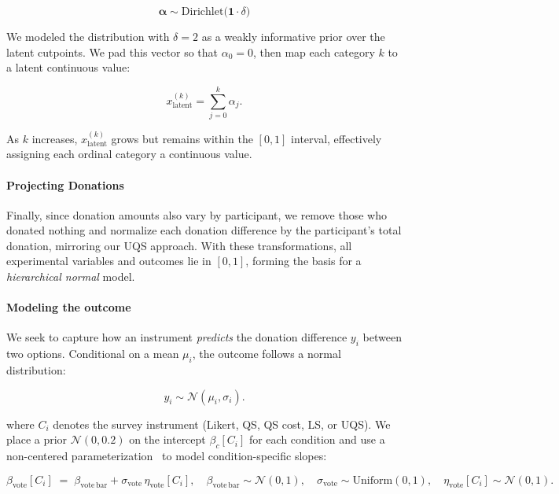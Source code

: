 \begin{equation}
    \boldsymbol{\alpha} \sim \mathrm{Dirichlet}\bigl(\mathbf{1}\cdot \delta\bigr)
\end{equation}

We modeled the distribution with $\delta=2$ as a weakly informative prior over the latent cutpoints. We pad this vector so that $\alpha_0 = 0$, then map each category $k$ to a latent continuous value:

\begin{equation}
    x_{\mathrm{latent}}^{(k)} = \sum_{j=0}^{k} \alpha_j.
\end{equation}

As $k$ increases, $x_{\mathrm{latent}}^{(k)}$ grows but remains within the $[0,1]$ interval, effectively assigning each ordinal category a continuous value. 

\paragraph{Projecting Donations} Finally, since donation amounts also vary by participant, we remove those who donated nothing and normalize each donation difference by the participant's total donation, mirroring our UQS approach. With these transformations, all experimental variables and outcomes lie in $[0,1]$, forming the basis for a \emph{hierarchical normal} model.

\paragraph{Modeling the outcome}
We seek to capture how an instrument \emph{predicts} the donation difference $y_i$ between two options. Conditional on a mean $\mu_i$, the outcome follows a normal distribution:

\begin{equation}
    \label{eq:intensity_normal}
    y_i \sim \mathcal{N}(\mu_i, \sigma_i).
\end{equation}

where $C_i$ denotes the survey instrument (Likert, QS, QS cost, LS, or UQS). We place a prior $\mathcal{N}(0,0.2)$ on the intercept $\beta_{c}[C_i]$ for each condition and use a non-centered parameterization~\cite{mcelreath2018statistical} to model condition-specific slopes:

\begin{equation}
    \beta_{\text{vote}}[C_i]
    \;=\;
    \beta_{\text{vote}\,\text{bar}}
    + \sigma_{\text{vote}}\,\eta_{\text{vote}}[C_i],
    \quad
    \beta_{\text{vote}\,\text{bar}}
    \sim
    \mathcal{N}(0,1),
    \quad
    \sigma_{\text{vote}}
    \sim
    \mathrm{Uniform}(0,1),
    \quad
    \eta_{\text{vote}}[C_i]
    \sim
    \mathcal{N}(0,1).
\end{equation}

